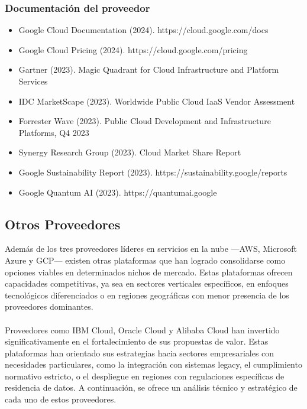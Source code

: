 {            \subsubsection{Documentación del proveedor}
                \begin{itemize}
                    \item Google Cloud Documentation (2024). https://cloud.google.com/docs
                    \item Google Cloud Pricing (2024). https://cloud.google.com/pricing
                    \item Gartner (2023). Magic Quadrant for Cloud Infrastructure and Platform Services
                    \item IDC MarketScape (2023). Worldwide Public Cloud IaaS Vendor Assessment
                    \item Forrester Wave (2023). Public Cloud Development and Infrastructure Platforms, Q4 2023
                    \item Synergy Research Group (2023). Cloud Market Share Report
                    \item Google Sustainability Report (2023). https://sustainability.google/reports
                    \item Google Quantum AI (2023). https://quantumai.google
                \end{itemize}

        \subsection{Otros Proveedores}
            Además de los tres proveedores líderes en servicios en la nube —AWS, Microsoft Azure y GCP— existen otras plataformas que han logrado consolidarse como opciones viables en determinados nichos de mercado. Estas plataformas ofrecen capacidades competitivas, ya sea en sectores verticales específicos, en enfoques tecnológicos diferenciados o en regiones geográficas con menor presencia de los proveedores dominantes.
            
            \paragraph{}Proveedores como IBM Cloud, Oracle Cloud y Alibaba Cloud han invertido significativamente en el fortalecimiento de sus propuestas de valor. Estas plataformas han orientado sus estrategias hacia sectores empresariales con necesidades particulares, como la integración con sistemas legacy, el cumplimiento normativo estricto, o el despliegue en regiones con regulaciones específicas de residencia de datos. A continuación, se ofrece un análisis técnico y estratégico de cada uno de estos proveedores.

}
